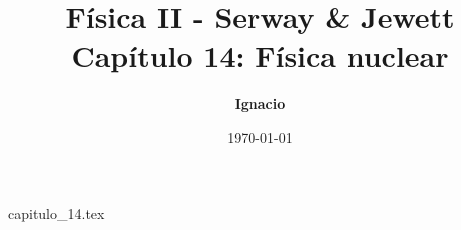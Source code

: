 \documentclass[11pt,spanish,oneside]{report}
\title{\textbf{Física II - Serway \& Jewett} \\ \Large Capítulo 14: Física nuclear}
\author{\textbf{Ignacio}}
\date{\today}
\begin{document}
\maketitle

{capitulo_14.tex}
\end{document}
